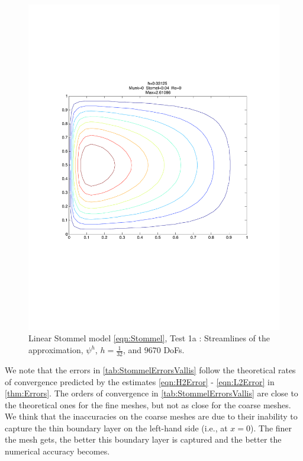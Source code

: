 \begin{figure}%
  \begin{center}
    \includegraphics[scale=0.5]{Figures/linearStommelVallis.pdf}
    \caption{Linear Stommel model \eqref{eqn:Stommel}, Test 1a \cite{Vallis06}: Streamlines of the approximation,
    $\psi^h$, $h=\frac{1}{32}$, and $9670$ DoFs.}
    \label{fig:StommelVallis}
  \end{center}
\end{figure}
We note that the errors in \autoref{tab:StommelErrorsVallis} follow the
theoretical rates of convergence predicted by the estimates \eqref{eqn:H2Error}
- \eqref{eqn:L2Error} in \autoref{thm:Errors}. The orders of convergence in
\autoref{tab:StommelErrorsVallis} are close to the theoretical ones for the fine
meshes, but not as close for the coarse meshes. We think that the inaccuracies
on the coarse meshes are due to their inability to capture the thin boundary
layer on the left-hand side (i.e., at $x=0$). The finer the mesh gets, the
better this boundary layer is captured and the better the numerical accuracy
becomes.

